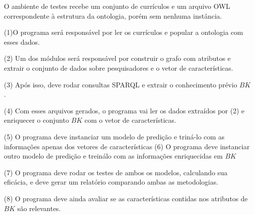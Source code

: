 O ambiente de testes recebe um conjunto de currículos e um arquivo OWL correspondente à estrutura da ontologia, porém sem nenhuma instância.

(1)O programa será responsável por ler os currículos e popular a ontologia com esses dados.

(2) Um dos módulos será responsável por construir o grafo com atributos e extrair o conjunto de dados sobre pesquisadores e o vetor de características. %

(3) Após isso, deve rodar consultas SPARQL e extrair o conhecimento prévio $BK$.

(4) Com esses arquivos gerados, o programa vai ler os dados extraídos por (2) e enriquecer o conjunto $BK$ com o vetor de características.

(5) O programa deve instanciar um modelo de predição e triná-lo com as informações apenas dos vetores de características
(6) O programa deve instanciar outro modelo de predição e treinálo com as informações enriquecidas em $BK$

(7) O programa deve rodar os testes de ambos os modelos, calculando sua eficácia, e deve gerar um relatório comparando ambas as metodologias.

(8) O programa deve ainda avaliar se as características contidas nos atributos de $BK$ são relevantes.



